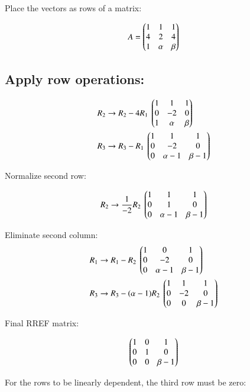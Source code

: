 \documentclass{article}
\begin{document}
Place the vectors as rows of a matrix:


\begin{align}
A = \begin{pmatrix}
1 & 1 & 1 \\
4 & 2 & 4 \\
1 & \alpha & \beta
\end{pmatrix}
\end{align}



\subsection*{Apply row operations:}

\begin{align}
R_2 &\rightarrow R_2 - 4R_1 \
\begin{pmatrix}
1 & 1 & 1 \\
0 & -2 & 0 \\
1 & \alpha & \beta
\end{pmatrix}\\
R_3 &\rightarrow R_3 - R_1 \
\begin{pmatrix}
1 & 1 & 1 \\
0 & -2 & 0 \\
0 & \alpha - 1 & \beta - 1
\end{pmatrix}
\end{align}

Normalize second row:


\begin{align}
R_2 \rightarrow \frac{1}{-2} R_2 \
\begin{pmatrix}
1 & 1 & 1 \\
0 & 1 & 0 \\
0 & \alpha - 1 & \beta - 1
\end{pmatrix}
\end{align}



Eliminate second column:
\begin{align}
R_1 &\rightarrow R_1 - R_2 \
\begin{pmatrix}
1 & 0 & 1 \\
0 & -2 & 0 \\
0 & \alpha - 1 & \beta - 1
\end{pmatrix}\\
R_3 &\rightarrow R_3 - (\alpha - 1) R_2 \
\begin{pmatrix}
1 & 1 & 1 \\
0 & -2 & 0 \\
0 & 0 & \beta - 1
\end{pmatrix}
\end{align}

Final RREF matrix:


\begin{align}
\begin{pmatrix}
1 & 0 & 1 \\
0 & 1 & 0 \\
0 & 0 & \beta - 1
\end{pmatrix}
\end{align}



For the rows to be linearly dependent, the third row must be zero:
\end{document}
